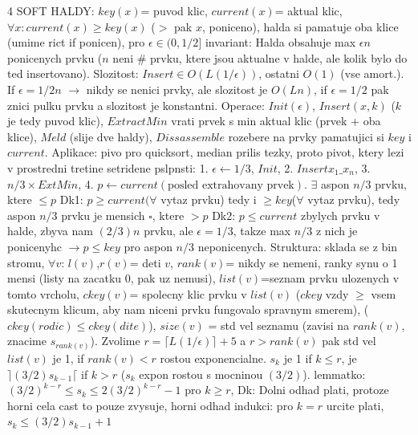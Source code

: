 \documentclass[8pt]{extarticle}
\begin{document}
\begin{multicols*}{4}
SOFT HALDY: $key(x)$= puvod klic, $current(x)$= aktual klic, $\forall x: current(x)\geq key(x)$ ($>$ pak $x$, poniceno), halda si pamatuje oba klice (umime rict if ponicen), pro $\epsilon \in (0, 1/2]$ invariant: Halda obsahuje max $\epsilon n$ ponicenych prvku ($n$ neni \# prvku, ktere jsou aktualne v halde, ale kolik bylo do ted insertovano). Slozitost: $Insert \in O(L(1/\epsilon))$, ostatni $O(1)$ (vse amort.). If $\epsilon = 1/2n$ $\rightarrow$ nikdy se nenici prvky, ale slozitost je $O(Ln)$, if $\epsilon =1/2$ pak znici pulku prvku a slozitost je konstantni. Operace: $Init(\epsilon)$, $Insert(x,k)$ ($k$ je tedy puvod klic), $ExtractMin$ vrati prvek s min aktual klic (prvek + oba klice), $Meld$ (slije dve haldy), $Dissassemble$ rozebere na prvky pamatujici si $key$ i $current$. Aplikace: pivo pro quicksort, median prilis tezky, proto pivot, ktery lezi v prostredni tretine setridene pslpnsti: 1. $\epsilon \leftarrow 1/3$, $Init$, 2. $Insert x_1\_x_n$, 3. $n/3 \times ExtMin$, 4. $p \leftarrow current(\text{posled extrahovany prvek})$. $\exists$ aspon $n/3$ prvku, ktere $\leq p$ Dk1: $p\geq current(\forall$ vytaz prvku) tedy i $\geq key$($\forall$ vytaz prvku), tedy aspon $n/3$ prvku je mensich $\square$, ktere $>p$ Dk2: $p \leq current$ zbylych prvku v halde, zbyva nam $(2/3)n$ prvku, ale $\epsilon=1/3$, takze max $n/3$ z nich je ponicenyhc $\rightarrow p\leq key$ pro aspon $n/3$ neponicenych. Struktura: sklada se z bin stromu, $\forall v$: $l(v)$,$r(v)$= deti $v$, $rank(v)$= nikdy se nemeni, ranky synu o 1 mensi (listy na zacatku 0, pak uz nemusi), $list(v)$=seznam prvku ulozenych v tomto vrcholu, $ckey(v)$= spolecny klic prvku v $list(v)$ ($ckey$ vzdy $\geq$ vsem skutecnym klicum, aby nam niceni prvku fungovalo spravnym smerem), ($ckey(rodic)\leq ckey(dite)$), $size(v)$ = std vel seznamu (zavisi na $rank(v)$, znacime $s_{rank(v)}$). Zvolime $r=\lceil L(1/\epsilon)\rceil +5$ a $r>rank(v)$ pak std vel $list(v)$ je 1,  if $rank(v)<r$ rostou exponencialne. $s_k$ je 1 if $k\leq r$, je $\rceil (3/2) s_{k-1}\lceil$ if $k>r$ ($s_k$ expon rostou s mocninou $(3/2)$). lemmatko: $(3/2)^{k-r} \leq s_k \leq 2(3/2)^{k-r} -1$ pro $k\geq r$, Dk: Dolni odhad plati, protoze horni cela cast to pouze zvysuje, horni odhad indukci:  pro $k=r$ urcite plati, $s_k \leq (3/2)s_{k-1} +1$

\end{multicols*}
\end{document}
